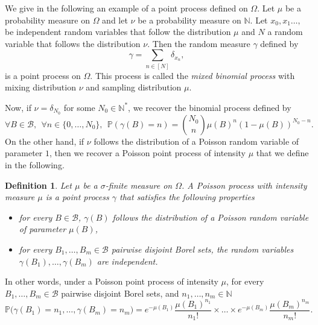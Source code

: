 \documentclass[twoside,11pt]{book}
\newtheorem{definition}{Definition}
\newtheorem{example}{Example}
\numberwithin{theorem}{chapter}
\numberwithin{definition}{chapter}
\numberwithin{proposition}{chapter}
\numberwithin{corollary}{chapter}
\numberwithin{example}{chapter}
\numberwithin{lemma}{chapter}
\begin{document}
We give in the following an example of a point process defined on $\Omega$. Let $\mu$ be a probability measure on $\Omega$ and let $\nu$ be a probability measure on $\mathbb{N}$. Let $x_{0}, x_{1} \dots, $ be independent random variables that follow the distribution $\mu$ and $N$ a random variable that follows the distribution $\nu$.
Then the random measure $\gamma$ defined by
\begin{equation}
\gamma = \sum\limits_{n \in [N]} \delta_{x_{n}},
\end{equation}
is a point process on $\Omega$. This process is called the \emph{mixed binomial process} with mixing distribution $\nu$ and sampling distribution $\mu$.

Now, if  $\nu = \delta_{N_0}$ for some $N_0 \in \mathbb{N}^{*}$, we recover the binomial process defined by
\begin{equation}\label{eq:binomial_cylinder_prb}
\forall B \in \mathcal{B}, \:\:\forall n \in \{0, \dots, N_0\}, \:\: \mathbb{P}(\gamma(B) = n) = \binom{N_0}{n}\mu(B)^{n}(1-\mu(B))^{N_0-n}.
\end{equation}
On the other hand, if $\nu$ follows the distribution of a Poisson random variable of parameter $1$, then we recover a Poisson point process of intensity $\mu$ that we define in the following.
\begin{definition}
Let $\mu$ be a $\sigma$-finite measure on $\Omega$. A Poisson process with intensity measure $\mu$ is a point process $\gamma$  that satisfies the following properties
\begin{itemize}
\item for every $B \in \mathcal{B}$, $\gamma(B)$ follows the distribution of a Poisson random variable of parameter $\mu(B)$,
\item for every $B_{1}, \dots, B_{m} \in \mathcal{B}$ pairwise disjoint Borel sets, the random variables $\gamma(B_{1}), \dots, \gamma(B_{m})$ are independent. 
\end{itemize}
\end{definition}

In other words, under a Poisson point process of intensity $\mu$, for every $B_{1}, \dots, B_{m} \in \mathcal{B}$ pairwise disjoint Borel sets, and $n_{1}, \dots, n_{m} \in \mathbb{N}$
\begin{equation}\label{eq:poisson_cylinder_prb}
\mathbb{P} \bigg(\gamma(B_{1}) = n_{1}, \dots, \gamma(B_{m}) = n_{m} \bigg) = e^{- \mu(B_{1})}\frac{ \mu(B_{1})^{n_1}}{n_{1}!} \times \dots \times e^{- \mu(B_{m})}\frac{ \mu(B_{m})^{n_m}}{n_{m}!} .
\end{equation}
\end{document}
